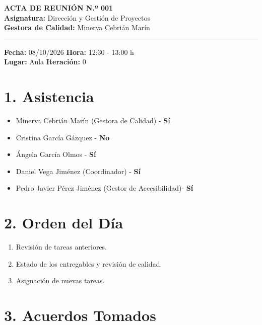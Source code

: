 
\begin{center}
    {\Large \textbf{ACTA DE REUNIÓN N.º 001}}\\[0.2cm]
    \textbf{Asignatura:} Dirección y Gestión de Proyectos\\
    \textbf{Gestora de Calidad:} Minerva Cebrián Marín
\end{center}

\vspace{0.3cm}
\hrule
\vspace{0.4cm}

\noindent \textbf{Fecha:} 08/10/2026 \hfill \textbf{Hora:} 12:30 - 13:00 h\\
\noindent \textbf{Lugar:} Aula  \hfill \textbf{Iteración:} 0

\vspace{0.4cm}

\section*{1. Asistencia}
\begin{itemize}
    \item Minerva Cebrián Marín (Gestora de Calidad) - \textbf{Sí}
    \item Cristina García Gázquez  - \textbf{No}
    \item Ángela García Olmos  - \textbf{Sí}
    \item Daniel Vega Jiménez (Coordinador) - \textbf{Sí}
    \item Pedro Javier Pérez Jiménez (Gestor de Accesibilidad)- \textbf{Sí}
\end{itemize}



\section*{2. Orden del Día}
\begin{enumerate}
    \item Revisión de tareas anteriores.
    \item Estado de los entregables y revisión de calidad.
    \item Asignación de nuevas tareas.
\end{enumerate}

\section*{3. Acuerdos Tomados}

